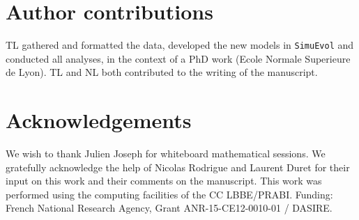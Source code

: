\documentclass[authoryear]{elsarticle} %
\providecommand{\DIFaddbegin}{} %
\providecommand{\DIFaddend}{} %
\providecommand{\DIFdelbegin}{} %
\providecommand{\DIFdelend}{} %
\begin{document}
\section{Author contributions}
TL gathered and formatted the data, developed the new models in \texttt{SimuEvol} and conducted all analyses, in the context of a PhD work (Ecole Normale Superieure de Lyon).
TL and NL both contributed to the writing of the manuscript.

\section{Acknowledgements}
We wish to thank Julien Joseph for whiteboard mathematical sessions.
We gratefully acknowledge the help of Nicolas Rodrigue and Laurent Duret for their input on this work and their comments on the manuscript.
This work was performed using the computing facilities of the CC LBBE/PRABI.
Funding: French National Research Agency, Grant ANR-15-CE12-0010-01 / DASIRE.

\DIFdelbegin %
\DIFdelend \DIFaddbegin 
\DIFaddend 
\end{document}
